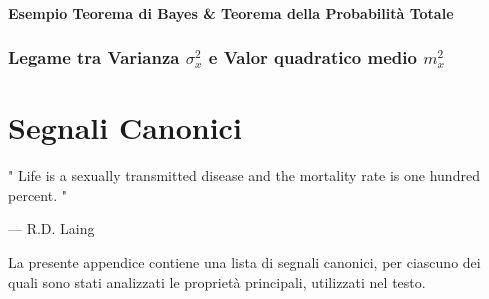 \documentclass[12pt,oneside,openany]{memoir}
\numberwithin{equation}{subsection}
\begin{document}
\newpage
\subsubsection{Esempio Teorema di Bayes \& Teorema della Probabilit\`a Totale}


\newpage
\subsection{Legame tra Varianza $\sigma_x^2$ e Valor quadratico medio $m_x^2$}


\appendix


\chapter{Segnali Canonici}
\epigraph{"
	Life is a sexually transmitted disease and the mortality rate is one
	hundred percent.
"}{--- \textup{R.D. Laing}}
La presente appendice contiene una lista di segnali canonici, per ciascuno dei
quali sono stati analizzati le propriet\`a principali, utilizzati nel testo.

\end{document}
